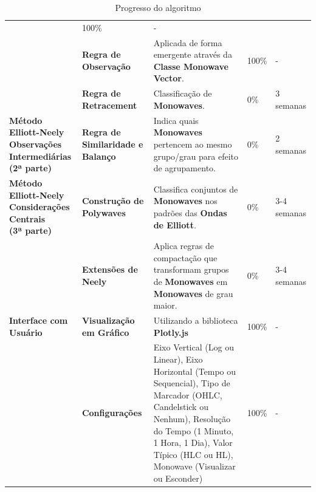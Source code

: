\documentclass[12pt]{article}
\begin{document}
\begin{table}[H]
\begin{tabular}{|L{3cm}|L{2cm}|L{5cm}|R{1.4cm}|R{1.4cm}|}
		& 100\%
		& - \\
		& \textbf{Regra de Observação}
		& Aplicada de forma emergente através da \textbf{Classe Monowave Vector}.
		& 100\%
		& - \\
		& \textbf{Regra de Retracement}
		& Classificação de \textbf{Monowaves}.
		& 0\%
		& 3 semanas \\
	\hline
	\textbf{Método Elliott-Neely \newline Observações Intermediárias \newline (2ª parte)}
		& \textbf{Regra de Similaridade e Balanço}
		& Indica quais \textbf{Monowaves} pertencem ao mesmo grupo/grau para efeito de agrupamento.
		& 0\%
		& 2 semanas \\
	\hline
	\textbf{Método Elliott-Neely \newline Considerações Centrais \newline (3ª parte)}
		& \textbf{Construção de Polywaves}
		& Classifica conjuntos de \textbf{Monowaves} nos padrões das \textbf{Ondas de Elliott}.
		& 0\%
		& 3-4 semanas \\
		& \textbf{Extensões de Neely}
		& Aplica regras de compactação que transformam grupos de \textbf{Monowaves} em \textbf{Monowaves} de grau maior.
		& 0\%
		& 3-4 semanas \\
	\hline
	\textbf{Interface com Usuário}
		& \textbf{Visualização em Gráfico}
		& Utilizando a biblioteca \textbf{Plotly.js}
		& 100\%
		& - \\
		& \textbf{Configurações}
		& Eixo Vertical (Log ou Linear), Eixo Horizontal (Tempo ou Sequencial), Tipo de Marcador (OHLC, Candelstick ou Nenhum), Resolução do Tempo (1 Minuto, 1 Hora, 1 Dia), Valor Típico (HLC ou HL), Monowave (Visualizar ou Esconder)
		& 100\%
		& - \\
	\hline
\end{tabular} 
\caption{Progresso do algoritmo}
\label{tab:progresso}
\end{table}
\endgroup

\newpage

\raggedright

{}


\newpage

{}
\end{document}

